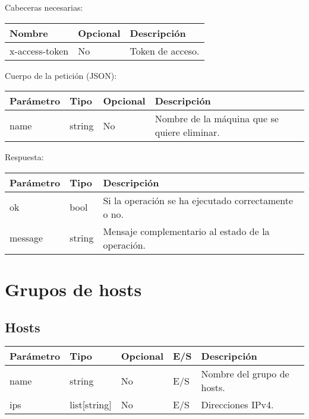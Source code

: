 Cabeceras necesarias:
\begin{table}[h!]
	\centering
	\begin{adjustbox}{max width=\textwidth}
	\begin{tabular}{|l|l|l|}
		\hline
		Nombre & Opcional & Descripción \\ \hline
		x-access-token & No & Token de acceso. \\ \hline
	\end{tabular}
\end{adjustbox}
\end{table}

Cuerpo de la petición (JSON):
\begin{table}[!h]
	\centering
	\begin{adjustbox}{max width=\textwidth}
	\begin{tabular}{|l|l|l|l|}
		\hline
		Parámetro & Tipo & Opcional & Descripción \\ \hline
		name & string & No & Nombre de la máquina que se quiere eliminar. \\ \hline
	\end{tabular}
\end{adjustbox}
\end{table}

Respuesta:
\begin{table}[!h]
	\centering
	\begin{adjustbox}{max width=\textwidth}
	\begin{tabular}{|l|l|l|}
		\hline
		Parámetro & Tipo & Descripción \\ \hline
		ok & bool & Si la operación se ha ejecutado correctamente o no. \\ \hline
		message & string & Mensaje complementario al estado de la operación. \\ \hline
	\end{tabular}
\end{adjustbox}
\end{table}










\section{Grupos de hosts}

\subsection{Hosts}
\begin{table}[!h]
	\centering
	\begin{adjustbox}{max width=\textwidth}
	\begin{tabular}{|l|l|l|l|l|}
		\hline
		Parámetro & Tipo & Opcional & E/S & Descripción \\ \hline
		name & string & No & E/S & Nombre del grupo de hosts. \\ \hline
		ips & list[string] & No & E/S & Direcciones IPv4. \\ \hline
	\end{tabular}
\end{adjustbox}
\end{table}

